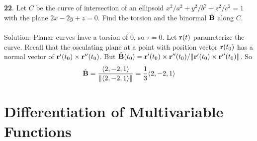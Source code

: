 \documentclass[12pt]{amsbook}
\newcommand{\la}{\langle}
\newcommand{\ra}{\rangle}
\begin{document}
\\
\\
{\small\bf 22}. Let $C$ be the curve of intersection of an ellipsoid $x^2/a^2+y^2/b^2+z^2/c^2=1$ with the plane $2x-2y+z=0$. Find the torsion and the binormal $\hat{\bf B}$ along $C$.
\\
\\
{\sc Solution}: Planar curves have a torsion of $0$, so $\tau=0$. Let ${\bf r}(t)$ parameterize the curve. Recall that the osculating plane at a point with position vector ${\bf r}(t_0)$ has a normal vector of ${\bf r}'(t_0)\times{\bf r}''(t_0)$. But $\hat{\bf B}(t_0)={\bf r}'(t_0)\times{\bf r}''(t_0)/\|{\bf r}'(t_0)\times{\bf r}''(t_0)\|$. So 
$$\hat{\bf B}=\frac{\la 2,-2,1 \ra}{\|\la 2,-2,1 \ra\|}=\frac{1}{3}\la 2,-2,1 \ra$$


\chapter{Differentiation of Multivariable  Functions}
\end{document}
